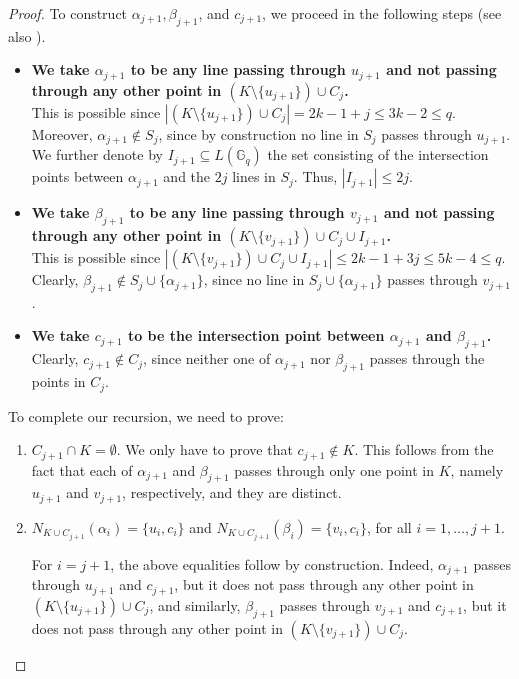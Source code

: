 \documentclass[a4paper,UKenglish,cleveref, autoref, thm-restate]{arxiv}
\newcommand{\ls}{\leqslant}
\newcommand{\G}[1][q]{\mathbb{G}_{#1}}
\begin{document}
\begin{proof}
    \noindent To construct $\alpha_{j+1}, \beta_{j+1}$, and $c_{j+1}$, we proceed in the following steps (see also ). 
    \begin{itemize}
        \item  \textbf{We take $\alpha_{j+1}$ to be any line passing through $u_{j+1}$ and not passing through any other point in $\left(K\setminus\{u_{j+1}\}\right) \cup C_{j}$.} \\ 
        This is possible since $|(K\setminus\{u_{j+1}\}) \cup C_{j}| = 2k-1 + j \ls 3k-2 \ls q$. Moreover,  $\alpha_{j+1} \not\in S_j$, since by construction no line in $S_j$ passes through $u_{j+1}$.
        We further denote by $I_{j+1} \subseteq L(\G)$ the set consisting of the intersection points between $\alpha_{j+1}$ and the $2j$ lines in $S_j$. Thus, $|I_{j+1}| \ls 2j$.
        \item \textbf{We take $\beta_{j+1}$ to be any line passing through $v_{j+1}$ and not passing through any other point in $(K\setminus\{v_{j+1}\}) \cup C_{j} \cup I_{j+1}$.} \\
        This is possible since $|(K\setminus\{v_{j+1}\}) \cup C_{j} \cup I_{j+1}| \ls 2k-1 + 3j \ls 5k-4 \ls q$. Clearly,  $\beta_{j+1} \not\in S_j \cup \{\alpha_{j+1} \}$, since no line in $S_j \cup \{\alpha_{j+1} \}$ passes through $v_{j+1}$.
        \item \textbf{We take $c_{j+1}$ to be the intersection point between  $\alpha_{j+1}$ and $\beta_{j+1}$.} \\ Clearly,  $c_{j+1} \not\in C_j$, since neither one of $\alpha_{j+1}$ nor $\beta_{j+1}$ passes through the points in $C_j$.
    \end{itemize}

    \noindent To complete our recursion, we need to prove:
    \begin{enumerate}
        \item $C_{j+1} \cap K = \emptyset$. We only have to prove that $c_{j+1} \not\in K$. This follows from the fact that each of $\alpha_{j+1}$ and $\beta_{j+1}$ passes through only one point in $K$, namely $u_{j+1}$ and $v_{j+1}$, respectively, and they are distinct.
        \item $N_{K \cup C_{j+1}} (\alpha_i) = \{u_i, c_i\}$ and $N_{K \cup C_{j+1}} (\beta_i) = \{v_i, c_i\}$, for all $i=1,\dots,j+1$.

        For $i=j+1$, the above equalities follow  by construction. Indeed, $\alpha_{j+1}$ passes through $u_{j+1}$ and $c_{j+1}$, but it does not pass through any other point in $(K\setminus\{u_{j+1}\}) \cup C_{j}$, and similarly, $\beta_{j+1}$ passes through $v_{j+1}$ and $c_{j+1}$, but it does not pass through any other point in $(K\setminus\{v_{j+1}\}) \cup C_{j}$.


\end{enumerate}
\end{proof}
\end{document}
